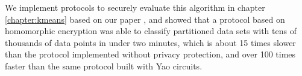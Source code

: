 We implement protocols to securely evaluate this algorithm in chapter
\ref{chapter:kmeans} based on our paper \cite{kruger05}, and showed
that a protocol based on homomorphic encryption was able to classify
partitioned data sets with tens of thousands of data points in under
two minutes, which is about 15 times slower than the protocol implemented
without privacy protection, and over 100 times faster than the same
protocol built with Yao circuits.


\begin{comment}
\section{Other Optimizations}

\label{sub:Other-Optimizations}

In the usual formulation of secure function evaluation, there are
designated outputs for each party, and it is required that no extra
information is learned by any party. This definition could be expanded
to assign non-output values the labels {}``sensitive'' and {}``non-sensitive'',
where the protocol is considered secure if no sensitive information
is leaked. %


In section \ref{sub:Primitives}, I presented many basic cryptographic
primitives that are used in SFE. Improving the state of the art of
any one of those primitives would automatically benefit all SFE protocols
that make use of that primitive. Based on my experience with real
implementations of SFE protocols, the oblivious transfer steps tend
to be very expensive in terms of space and communication. Common oblivious
transfer protocols are based on discrete logarithms, but other trapdoor
functions may be used as well. %
A new $OT_{2}^{1}$ protocol is presented in chapter \ref{sec:OT-SquareRoots}.
and its security and performance are compared with the Naor-Pinkas
protocol. %

\end{comment}
%
